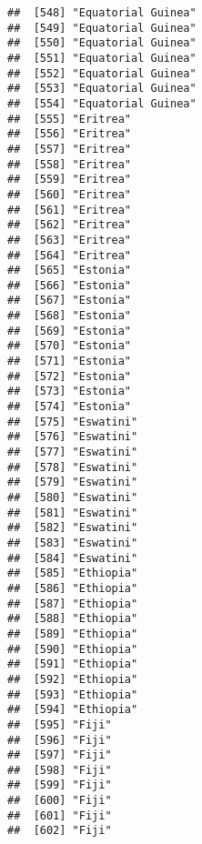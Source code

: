 \documentclass[]{article}
\begin{document}
\begin{verbatim}
##  [548] "Equatorial Guinea"                  
##  [549] "Equatorial Guinea"                  
##  [550] "Equatorial Guinea"                  
##  [551] "Equatorial Guinea"                  
##  [552] "Equatorial Guinea"                  
##  [553] "Equatorial Guinea"                  
##  [554] "Equatorial Guinea"                  
##  [555] "Eritrea"                            
##  [556] "Eritrea"                            
##  [557] "Eritrea"                            
##  [558] "Eritrea"                            
##  [559] "Eritrea"                            
##  [560] "Eritrea"                            
##  [561] "Eritrea"                            
##  [562] "Eritrea"                            
##  [563] "Eritrea"                            
##  [564] "Eritrea"                            
##  [565] "Estonia"                            
##  [566] "Estonia"                            
##  [567] "Estonia"                            
##  [568] "Estonia"                            
##  [569] "Estonia"                            
##  [570] "Estonia"                            
##  [571] "Estonia"                            
##  [572] "Estonia"                            
##  [573] "Estonia"                            
##  [574] "Estonia"                            
##  [575] "Eswatini"                           
##  [576] "Eswatini"                           
##  [577] "Eswatini"                           
##  [578] "Eswatini"                           
##  [579] "Eswatini"                           
##  [580] "Eswatini"                           
##  [581] "Eswatini"                           
##  [582] "Eswatini"                           
##  [583] "Eswatini"                           
##  [584] "Eswatini"                           
##  [585] "Ethiopia"                           
##  [586] "Ethiopia"                           
##  [587] "Ethiopia"                           
##  [588] "Ethiopia"                           
##  [589] "Ethiopia"                           
##  [590] "Ethiopia"                           
##  [591] "Ethiopia"                           
##  [592] "Ethiopia"                           
##  [593] "Ethiopia"                           
##  [594] "Ethiopia"                           
##  [595] "Fiji"                               
##  [596] "Fiji"                               
##  [597] "Fiji"                               
##  [598] "Fiji"                               
##  [599] "Fiji"                               
##  [600] "Fiji"                               
##  [601] "Fiji"                               
##  [602] "Fiji"                               

\end{verbatim}
\end{document}
